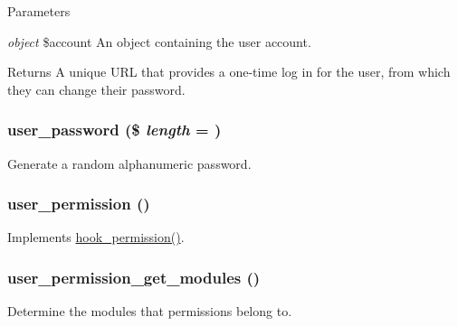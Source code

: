 \begin{DoxyParams}{Parameters}
\item[{\em object}]\$account An object containing the user account.\end{DoxyParams}
\begin{DoxyReturn}{Returns}
A unique URL that provides a one-\/time log in for the user, from which they can change their password. 
\end{DoxyReturn}
\hypertarget{user_8module_a74cfb0a6ae36efdbd637792b37257931}{
\subsubsection[{user\_\-password}]{\setlength{\rightskip}{0pt plus 5cm}user\_\-password (\$ {\em length} = {})}}
\label{user_8module_a74cfb0a6ae36efdbd637792b37257931}
Generate a random alphanumeric password. \hypertarget{user_8module_a0eb71b2d8881ca75248f3ed384f8b253}{
\subsubsection[{user\_\-permission}]{\setlength{\rightskip}{0pt plus 5cm}user\_\-permission ()}}
\label{user_8module_a0eb71b2d8881ca75248f3ed384f8b253}
Implements \hyperlink{group__hooks_ga2b22b45f4925f2478412477bae329713}{hook\_\-permission()}. \hypertarget{user_8module_a3f574091c39e067721fe6afbb5898bfd}{
\subsubsection[{user\_\-permission\_\-get\_\-modules}]{\setlength{\rightskip}{0pt plus 5cm}user\_\-permission\_\-get\_\-modules ()}}
\label{user_8module_a3f574091c39e067721fe6afbb5898bfd}
Determine the modules that permissions belong to.

